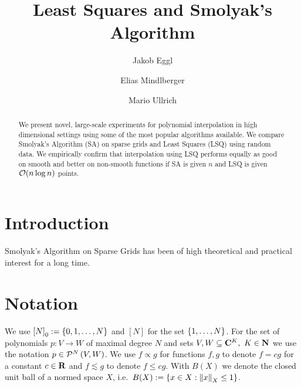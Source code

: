 \documentclass[12pt, oneside]{amsart}
\theoremstyle{definition}
\theoremstyle{remark}
\numberwithin{equation}{section}
\begin{document}
\title{Least Squares and Smolyak's Algorithm}


\author{Jakob Eggl}
\address{Institute of Analysis, Johannes Kepler University Linz, Austria.}

\author{Elias Mindlberger}
\address{Institute of Analysis, Johannes Kepler University Linz, Austria.}

\author{Mario Ullrich}
\address{Institute of Analysis, Johannes Kepler University Linz, Austria.}



\begin{abstract}
We present novel, large-scale experiments for polynomial interpolation in high dimensional settings using some of the most popular algorithms available. We compare Smolyak's Algorithm (SA) on sparse grids and Least Squares (LSQ) using random data. We empirically confirm that interpolation using LSQ performs equally as good on smooth and better on non-smooth functions if SA is given \(n\) and LSQ is given \(\cO(n \log n)\) points.
\end{abstract}


\maketitle
\thispagestyle{empty}


\tableofcontents

\newpage
\section{Introduction}
Smolyak's Algorithm on Sparse Grids has been of high theoretical and practical interest for a long time.


\section{Notation}


We use \({[N]}_0 \defn \set{0, 1, \dots, N}\) and \([N]\) for the set \(\set{1, \dots, N}\). For the set of polynomials \(p: V \to W\) of maximal degree \(N\) and sets \(V, W \subseteq \C^K,\ K \in \N\) we use the notation \(p \in \pols[N]{V, W}\). We use \(f \propto g\) for functions \(f, g\) to denote \(f = c g\) for a constant \(c \in \R\) and \(f \lesssim g\) to denote \(f \leq c g\). With \(B(X)\) we denote the closed unit ball of a normed space \(X\), i.e.\ \(B(X) \defn \set{x \in X: \norm[X]{x} \leq 1}\).
\end{document}
